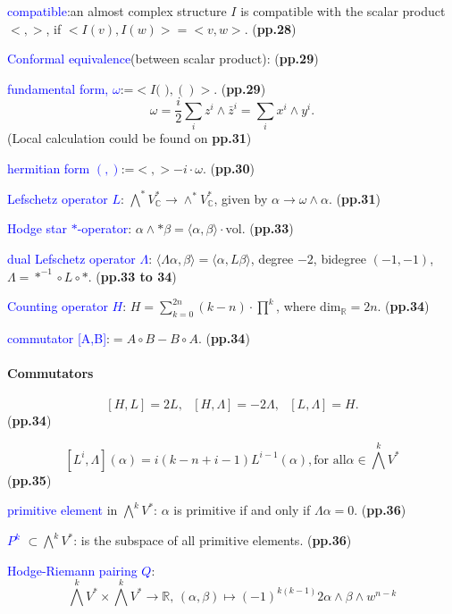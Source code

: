    \textcolor{blue}{compatible}:an almost complex structure $I$ is
    compatible with the scalar product $<,>$, if $<I(v),I(w)>=<v,w>$.
    (\textbf{pp.28})

    \textcolor{blue}{Conformal equivalence}(between scalar product):
    (\textbf{pp.29})

    \textcolor{blue}{fundamental form, $\omega$}:=$<I\text{( )},()>.$
    (\textbf{pp.29})
    $$\omega=\frac{i}{2}\sum_i z^i\wedge\bar{z}^i=\sum_i x^i\wedge y^i.$$
    \quad(Local calculation could be found on \textbf{pp.31})

    \textcolor{blue}{hermitian form $(,)$}:=$<,>-i\cdot\omega$.
    (\textbf{pp.30})

    \textcolor{blue}{Lefschetz operator $L$}:
        $\bigwedge^* V^*_{\mathbb{C}}\to
    \wedge^* V_{\mathbb{C}}^*$, given by $\alpha\to\omega\wedge\alpha$.
    (\textbf{pp.31})

    \textcolor{blue}{Hodge star $*$-operator}: $\alpha\wedge *\beta=
        \langle\alpha,\beta\rangle \cdot \text{vol}$.
    (\textbf{pp.33})

    \textcolor{blue}{dual Lefschetz operator $\Lambda$}:
        $\langle\Lambda\alpha,\beta\rangle =\langle\alpha,L\beta\rangle$,
        degree $-2$, bidegree $(-1,-1)$, $\Lambda=*^{-1}\circ L\circ *$.
    (\textbf{pp.33 to 34})

    \textcolor{blue}{Counting operator $H$}:
        $H=\sum_{k=0}^{2n}(k-n)\cdot\prod^k$, 
        where $\text{dim}_{\mathbb{R}}=2n$.
    (\textbf{pp.34})

    \textcolor{blue}{commutator [A,B]}:$=A\circ B-B\circ A$.
    (\textbf{pp.34})


\paragraph{Commutators}
$$[H,L]=2L,\text{ } [H,\Lambda]=-2\Lambda,\text{ } [L,\Lambda]=H.$$
(\textbf{pp.34})

$$[L^i,\Lambda](\alpha)= i(k-n+i-1)L^{i-1}(\alpha),\text{for all}
    \alpha\in\bigwedge^k V^*$$
(\textbf{pp.35})

    \textcolor{blue}{primitive element} in $\bigwedge^kV^*$:
        $\alpha$ is primitive if and only if $\Lambda\alpha=0$.
    (\textbf{pp.36})

    \textcolor{blue}{$P^k$} $\subset\bigwedge^kV^*$: is the subspace
    of all primitive elements.
    (\textbf{pp.36})

    \textcolor{blue}{Hodge-Riemann pairing $Q$}:
    $$\bigwedge^kV^*\times\bigwedge^kV^*\to \mathbb{R}\text{, }
     (\alpha,\beta)\mapsto (-1)^{k(k-1)}{2}\alpha\wedge\beta\wedge w^{n-k}$$

